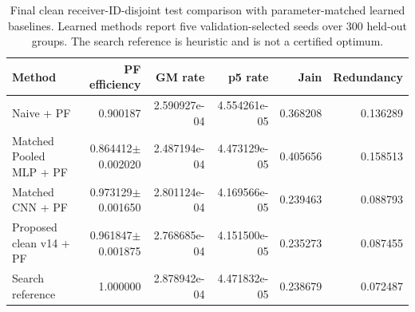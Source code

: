 \begin{table}[t]
\centering
\caption{Final clean receiver-ID-disjoint test comparison with parameter-matched learned baselines. Learned methods report five validation-selected seeds over 300 held-out groups. The search reference is heuristic and is not a certified optimum.}
\label{tab:matched_clean_baselines}
\begin{tabular}{lrrrrr}
\toprule
Method & PF efficiency & GM rate & p5 rate & Jain & Redundancy \\
\midrule
Naive + PF & 0.900187 & 2.590927e-04 & 4.554261e-05 & 0.368208 & 0.136289 \\
Matched Pooled MLP + PF & 0.864412$\pm$0.002020 & 2.487194e-04 & 4.473129e-05 & 0.405656 & 0.158513 \\
Matched CNN + PF & 0.973129$\pm$0.001650 & 2.801124e-04 & 4.169566e-05 & 0.239463 & 0.088793 \\
Proposed clean v14 + PF & 0.961847$\pm$0.001875 & 2.768685e-04 & 4.151500e-05 & 0.235273 & 0.087455 \\
Search reference & 1.000000 & 2.878942e-04 & 4.471832e-05 & 0.238679 & 0.072487 \\
\bottomrule
\end{tabular}
\end{table}